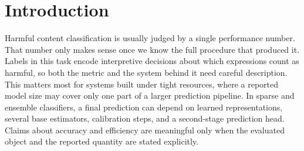 \documentclass[runningheads]{llncs}
\begin{document}
\begin{abstract}

\end{abstract}



\section{Introduction}
\label{sec:introduction}

Harmful content classification is usually judged by a single performance number. That number only makes sense once we know the full procedure that produced it. Labels in this task encode interpretive decisions about which expressions count as harmful, so both the metric and the system behind it need careful description. This matters most for systems built under tight resources, where a reported model size may cover only one part of a larger prediction pipeline. In sparse and ensemble classifiers, a final prediction can depend on learned representations, several base estimators, calibration steps, and a second-stage prediction head. Claims about accuracy and efficiency are meaningful only when the evaluated object and the reported quantity are stated explicitly.
\end{document}
